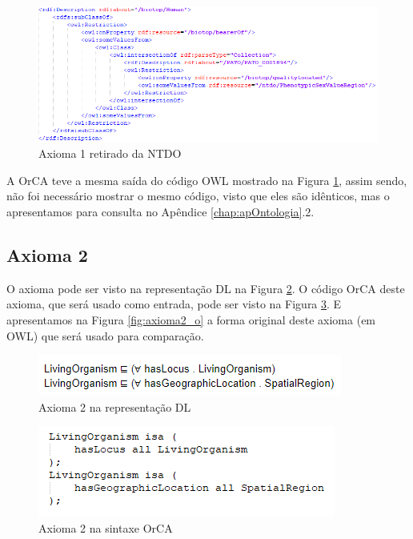 \documentclass{bcc}
\begin{document}
\begin{figure}[H]
\centering
\includegraphics[width=.8\textwidth]{Figuras/axioma1_o.png}
\caption{Axioma 1 retirado da NTDO} 
\label{fig:axioma1_o}
\end{figure}

A OrCA teve a mesma saída do código OWL mostrado na Figura \ref{fig:axioma1_o}, assim sendo, não foi necessário mostrar o mesmo código, visto que eles são idênticos, mas o apresentamos para consulta no Apêndice \ref{chap:apOntologia}.2.

\subsection{Axioma 2}
O axioma pode ser visto na representação DL na Figura \ref{fig:axioma2_dl}. O código OrCA deste axioma, que será usado como entrada, pode ser visto na Figura \ref{fig:axioma2_orca}. E apresentamos na Figura \ref{fig:axioma2_o} a forma original deste axioma (em OWL) que será usado para comparação. 

\begin{figure}[H]
\centering
\includegraphics[width=.7\textwidth]{Figuras/axioma2_dl.png}
\caption{Axioma 2 na representação DL} 
\label{fig:axioma2_dl}
\end{figure}

\begin{figure}[H]
\centering
\includegraphics[width=.7\textwidth]{Figuras/axioma2_orca.png}
\caption{Axioma 2 na sintaxe OrCA} 
\label{fig:axioma2_orca}
\end{figure}
\end{document}
